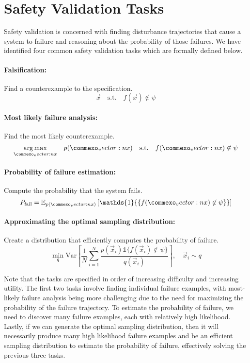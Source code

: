 \section{Safety Validation Tasks}

Safety validation is concerned with finding disturbance trajectories that cause a system to failure and reasoning about the probability of those failures. We have identified four common safety validation tasks which are formally defined below.

\paragraph{Falsification:} Find a counterexample to the specification. 
\begin{equation} 
\vec{x} \quad \text{s.t.} \quad f(\vec{x}) \not \in \psi
\end{equation}

\paragraph{Most likely failure analysis:} Find the most likely counterexample.
\begin{equation}
\underset{\vec{x}}{\argmax} \quad p(\vec{x}) \quad \text{s.t.} \quad f(\vec{x}) \not \in \psi
\end{equation}

\paragraph{Probability of failure estimation:} Compute the probability that the system fails.
\begin{equation}
P_{\rm fail} = \mathbb{E}_{p(\vec{x})}\left[ \mathds{1}{\{ f(\vec{x}) \not \in \psi \}} \right]
\end{equation}

\paragraph{Approximating the optimal sampling distribution:} Create a distribution that efficiently computes the probability of failure. 
\begin{equation}
\min_{q} \text{Var}\left[ \frac{1}{N} \sum_{i=1}^N \frac{p(\vec{x}_i) \mathds{1}{\{ f(\vec{x}_i) \not \in \psi \}}}{q(\vec{x}_i)} \right], \quad \vec{x}_i \sim q
\end{equation}

Note that the tasks are specified in order of increasing difficulty and increasing utility. The first two tasks involve finding individual failure examples, with most-likely failure analysis being more challenging due to the need for maximizing the probability of the failure trajectory. To estimate the probability of failure, we need to discover many failure examples, each with relatively high likelihood. Lastly, if we can generate the optimal sampling distribution, then it will necessarily produce many high likelihood failure examples and be an efficient sampling distribution to estimate the probability of failure, effectively solving the previous three tasks.

